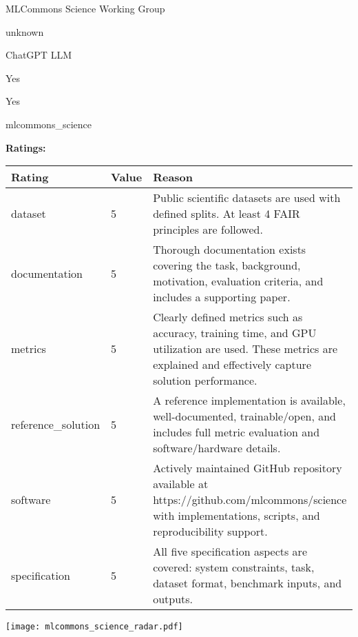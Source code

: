 {{\begin{description}[labelwidth=4cm, labelsep=1em, leftmargin=4cm, itemsep=0.1em, parsep=0em]
  \item[contact.name:] MLCommons Science Working Group
  \item[contact.email:] unknown
  \item[results.links.name:] ChatGPT LLM
  \item[fair.reproducible:] Yes
  \item[fair.benchmark\_ready:] Yes
  \item[id:] mlcommons\_science
  \item[Citations:] \cite{10.1007/978-3-031-23220-6_4}
\end{description}

{\bf Ratings:} ~ \\

\begin{tabular}{p{} p{} p{}}
\hline
Rating & Value & Reason \\
\hline
dataset & 5 & Public scientific datasets are used with defined splits. At least 4 FAIR principles
are followed.
 \\
documentation & 5 & Thorough documentation exists covering the task, background, motivation, evaluation
criteria, and includes a supporting paper.
 \\
metrics & 5 & Clearly defined metrics such as accuracy, training time, and GPU utilization are
used. These metrics are explained and effectively capture solution performance.
 \\
reference\_solution & 5 & A reference implementation is available, well-documented, trainable/open, and includes
full metric evaluation and software/hardware details.
 \\
software & 5 & Actively maintained GitHub repository available at https://github.com/mlcommons/science
with implementations, scripts, and reproducibility support.
 \\
specification & 5 & All five specification aspects are covered: system constraints, task, dataset format,
benchmark inputs, and outputs.
 \\
\hline
\end{tabular}

\texttt{[image: mlcommons\_science\_radar.pdf]}
}}
\clearpage